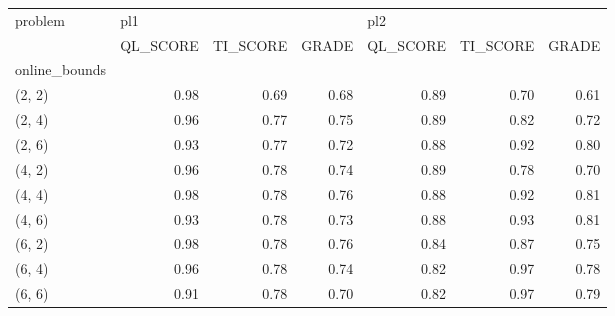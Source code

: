 \begin{tabular}{lrrrrrr}
\toprule
problem & \multicolumn{3}{l}{pl1} & \multicolumn{3}{l}{pl2} \\
{} & QL\_SCORE & TI\_SCORE & GRADE & QL\_SCORE & TI\_SCORE & GRADE \\
online\_bounds &          &          &       &          &          &       \\
\midrule
(2, 2)        &     0.98 &     0.69 &  0.68 &     0.89 &     0.70 &  0.61 \\
(2, 4)        &     0.96 &     0.77 &  0.75 &     0.89 &     0.82 &  0.72 \\
(2, 6)        &     0.93 &     0.77 &  0.72 &     0.88 &     0.92 &  0.80 \\
(4, 2)        &     0.96 &     0.78 &  0.74 &     0.89 &     0.78 &  0.70 \\
(4, 4)        &     0.98 &     0.78 &  0.76 &     0.88 &     0.92 &  0.81 \\
(4, 6)        &     0.93 &     0.78 &  0.73 &     0.88 &     0.93 &  0.81 \\
(6, 2)        &     0.98 &     0.78 &  0.76 &     0.84 &     0.87 &  0.75 \\
(6, 4)        &     0.96 &     0.78 &  0.74 &     0.82 &     0.97 &  0.78 \\
(6, 6)        &     0.91 &     0.78 &  0.70 &     0.82 &     0.97 &  0.79 \\
\bottomrule
\end{tabular}
